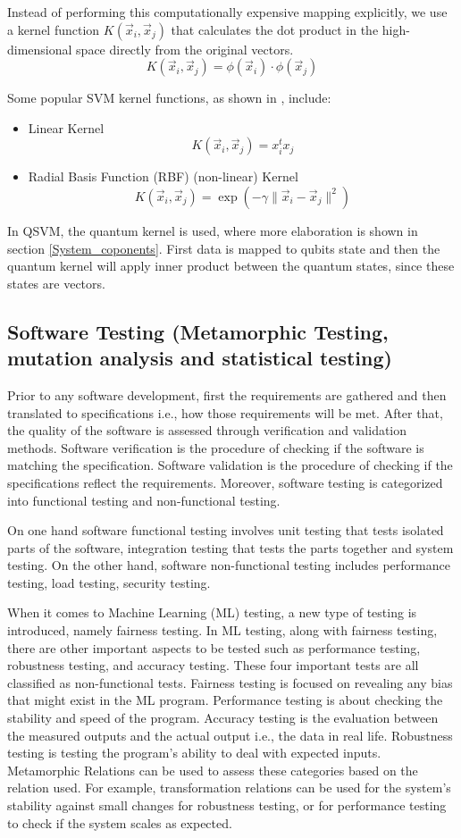 \documentclass[12pt,a4paper]{article}
\begin{document}
	Instead of performing this computationally expensive mapping explicitly, we use a kernel function $K(\vec{x}_i, \vec{x}_j)$ that calculates the dot product in the high-dimensional space directly from the original vectors.
	\[
	K(\vec{x}_i, \vec{x}_j) = \phi(\vec{x}_i) \cdot \phi(\vec{x}_j)
	\]
	
	Some popular SVM kernel functions, as shown in \cite{Dwarakanath2018}, include:
	\begin{itemize}
		\item Linear Kernel
		\[
		K(\vec{x}_i, \vec{x}_j) = x_i^t x_j
		\]
		\item Radial Basis Function (RBF) (non-linear) Kernel
		\[
		K(\vec{x}_i, \vec{x}_j) = \exp(-\gamma \|\vec{x}_i - \vec{x}_j\|^2)
		\]
	\end{itemize}
	
	In QSVM, the quantum kernel is used, where more elaboration is shown in section \ref{System_coponents}. First data is mapped to qubits state and then the quantum kernel will apply inner product between the quantum states, since these states are vectors.
	
	\subsection{Software Testing (Metamorphic Testing, mutation analysis and statistical testing)}
	
	Prior to any software development, first the requirements are gathered and then translated to specifications i.e., how those requirements will be met. After that, the quality of the software is assessed through verification and validation methods. Software verification is the procedure of checking if the software is matching the specification. Software validation is the procedure of checking if the specifications reflect the requirements. Moreover, software testing is categorized into functional testing and non-functional testing.
	
	On one hand software functional testing involves unit testing that tests isolated parts of the software, integration testing that tests the parts together and system testing. On the other hand, software non-functional testing includes performance testing, load testing, security testing.
	
	When it comes to Machine Learning (ML) testing, a new type of testing is introduced, namely fairness testing. In ML testing, along with fairness testing, there are other important aspects to be tested such as performance testing, robustness testing, and accuracy testing. These four important tests are all classified as non-functional tests. Fairness testing is focused on revealing any bias that might exist in the ML program. Performance testing is about checking the stability and speed of the program. Accuracy testing is the evaluation between the measured outputs and the actual output i.e., the data in real life. Robustness testing is testing the program's ability to deal with expected inputs. Metamorphic Relations can be used to assess these categories based on the relation used. For example, transformation relations can be used for the system's stability against small changes for robustness testing, or for performance testing to check if the system scales as expected.
	
\end{document}
